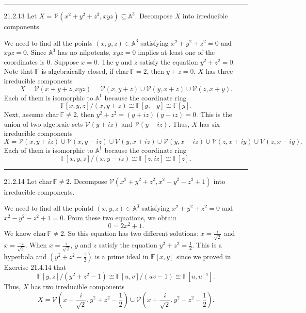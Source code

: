 \documentclass[letterpaper, 12pt]{article}
\begin{document}
\noindent\rule{7in}{2.8pt}
\begin{problem}{21.2.13}
Let \(X=\mathcal{V}(x^2+y^2+z^2,xyz)\subseteq \mathbb{A}^3\). Decompose \(X\) into irreducible components. 
\end{problem}
\begin{solution}
We need to find all the points \((x,y,z)\in \mathbb{A}^3\) satisfying \(x^2+y^2+z^2=0\) and \(xyz=0\). Since \(\mathbb{A}^3\) has no nilpotents, \(xyz=0\) implies at least one of the coordinates is \(0\). Suppose \(x=0\). The \(y\) and \(z\) satisfy the equation \(y^2+z^2=0\). Note that \(\mathbb{F}\) is algebraically closed, if \(\text{char}\ \mathbb{F}=2\), then \(y+z=0\). \(X\) has three irreducible components 
\[X=\mathcal{V}(x+y+z,xyz)=\mathcal{V}(x,y+z)\cup \mathcal{V}(y,x+z)\cup \mathcal{V}(z,x+y).\]
Each of them is isomorphic to \(\mathbb{A}^1\) because the coordinate ring 
\[\mathbb{F}[x,y,z]/(x,y+z)\cong \mathbb{F}[y,-y]\cong \mathbb{F}[y].\]
Next, assume \(\text{char}\ \mathbb{F}\neq 2\), then \(y^2+z^2=(y+iz)(y-iz)=0\). This is the union of two algebraic sets \(\mathcal{V}(y+iz)\) and \(\mathcal{V}(y-iz)\). Thus, \(X\) has six irreducible components 
\[X=\mathcal{V}(x,y+iz)\cup \mathcal{V}(x,y-iz)\cup \mathcal{V}(y,x+iz)\cup \mathcal{V}(y,x-iz)\cup \mathcal{V}(z,x+iy)\cup \mathcal{V}(z,x-iy).\]
Each of them is isomorphic to \(\mathbb{A}^1\) because the coordinate ring 
\[\mathbb{F}[x,y,z]/(x,y-iz)\cong \mathbb{F}[z,iz]\cong \mathbb{F}[z].\]
\end{solution}

\noindent\rule{7in}{2.8pt}
\begin{problem}{21.2.14}
Let \(\text{char}\, \mathbb{F}\neq 2\). Decompose \(\mathcal{V}(x^2+y^2+z^2,x^2-y^2-z^2+1)\) into irreducible components.
\end{problem}
\begin{solution}
We need to find all the pointd \((x,y,z)\in \mathbb{A}^3\) satisfying \(x^2+y^2+z^2=0\) and \(x^2-y^2-z^2+1=0\). From these two equations, we obtain 
\[0=2x^2+1.\]
We know \(\text{char}\, \mathbb{F}\neq 2\). So this equation has two different solutions: \(x=\frac{i}{\sqrt{2}}\) and \(x=\frac{-i}{\sqrt{2}}\). When \(x=\frac{i}{\sqrt{2}}\), \(y\) and \(z\) satisfy the equation \(y^2+z^2=\frac{1}{2}\). This is a hyperbola and \((y^2+z^2-\frac{1}{2})\) is a prime ideal in \(\mathbb{F}[x,y]\) since we proved in Exercise 21.4.14 that 
\[\mathbb{F}[y,z]/(y^2+z^2-1)\cong \mathbb{F}[u,v]/(uv-1)\cong \mathbb{F}[u,u^{-1}].\]
Thus, \(X\) has two irreducible components
\[X=\mathcal{V}(x-\frac{i}{\sqrt{2}},y^2+z^2-\frac{1}{2})\cup \mathcal{V}(x+\frac{i}{\sqrt{2}}, y^2+z^2-\frac{1}{2}).\]
\end{solution}
\end{document}
